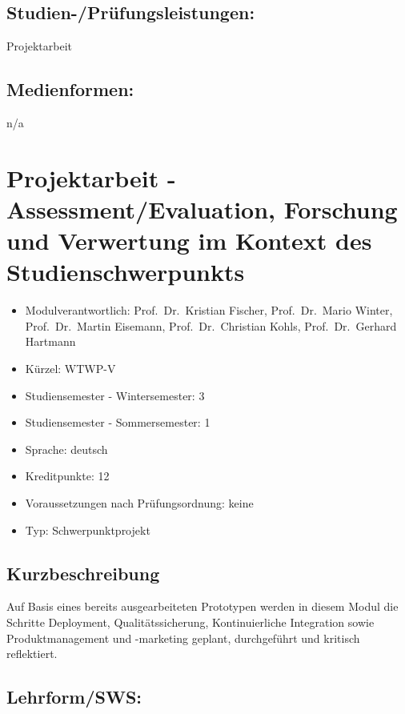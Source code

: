 \section*{Studien-/Prüfungsleistungen:}\label{studien-pruxfcfungsleistungen-8}

Projektarbeit

\section*{Medienformen:}\label{medienformen-8}

n/a

\chapter{Projektarbeit - Assessment/Evaluation, Forschung und Verwertung
im Kontext des
Studienschwerpunkts}\label{projektarbeit---assessmentevaluation-forschung-und-verwertung-im-kontext-des-studienschwerpunkts}

\begin{itemize}
\tightlist
\item
  Modulverantwortlich: Prof.~Dr.~Kristian Fischer, Prof.~Dr.~Mario
  Winter, Prof.~Dr.~Martin Eisemann, Prof.~Dr.~Christian Kohls,
  Prof.~Dr.~Gerhard Hartmann
\item
  Kürzel: WTWP-V
\item
  Studiensemester - Wintersemester: 3
\item
  Studiensemester - Sommersemester: 1
\item
  Sprache: deutsch
\item
  Kreditpunkte: 12
\item
  Voraussetzungen nach Prüfungsordnung: keine
\item
  Typ: Schwerpunktprojekt
\end{itemize}

\section*{Kurzbeschreibung}\label{kurzbeschreibung-3}

Auf Basis eines bereits ausgearbeiteten Prototypen werden in diesem
Modul die Schritte Deployment, Qualitätssicherung, Kontinuierliche
Integration sowie Produktmanagement und -marketing geplant, durchgeführt
und kritisch reflektiert.

\section*{Lehrform/SWS:}\label{lehrformsws-9}


